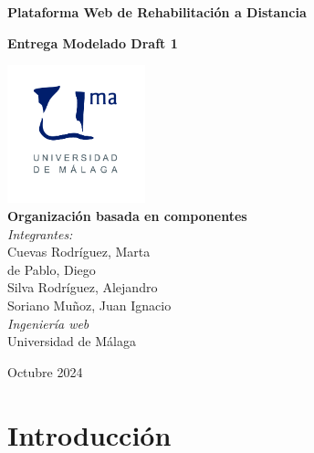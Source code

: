 \documentclass{article}
\begin{document}
	
	\begin{titlepage}
		\centering
		\vspace*{3cm}
		
		{\Huge \textbf{Plataforma Web de Rehabilitación a Distancia}\\[0.5cm]}
		
		{\Large \textbf{Entrega Modelado  Draft 1}\\[0.5cm]}
		
		\vspace{2cm}
		\includegraphics[width=0.3\textwidth]{images/uma_logo.jpg}\\[1cm]
		
		{\LARGE \textbf{Organización basada en componentes}\\[0.5cm]}
		{\large \textit{Integrantes:}\\
			Cuevas Rodríguez, Marta\\
			de Pablo, Diego\\
			Silva Rodríguez, Alejandro\\
			Soriano Muñoz, Juan Ignacio\\
		}
		\vfill
		{\large \textit{Ingeniería web}\\
			Universidad de Málaga\\
		}
		
		\vfill
		
		{\large Octubre 2024}
	\end{titlepage}
	
	\tableofcontents
	
	\newpage
	
	\section{Introducción}
\end{document}

